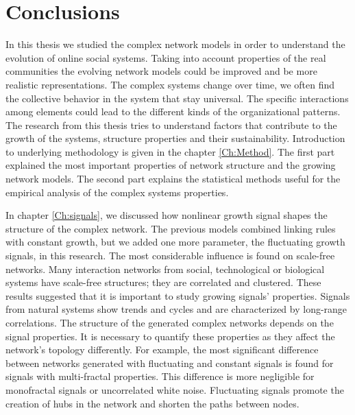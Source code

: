 \chapter{Conclusions} %
\label{Ch:Conclussion}

In this thesis we studied the complex network models in order to understand the evolution of online social systems. Taking into account properties of the real communities the evolving network models could be improved and be more realistic representations. The complex systems change over time, we often find the collective behavior in the system that stay universal. The specific interactions among elements could lead to the different kinds of the organizational patterns. The research from this thesis tries to understand factors that contribute to the growth of the systems, structure properties and their sustainability. Introduction to underlying methodology is given in the chapter \ref{Ch:Method}. The first part explained the most important properties of network structure and the growing network models. The second part explains the statistical methods useful for the empirical analysis of the complex systems properties.  

In chapter \ref{Ch:signals}, we discussed how nonlinear growth signal shapes the structure of the complex network. The previous models combined linking rules with constant growth, but we added one more parameter, the fluctuating growth signals, in this research. The most considerable influence is found on scale-free networks. Many interaction networks from social, technological or biological systems have scale-free structures; they are correlated and clustered. These results suggested that it is important to study growing signals' properties. Signals from natural systems show trends and cycles and are characterized by long-range correlations. The structure of the generated complex networks depends on the signal properties. It is necessary to quantify these properties as they affect the network's topology differently. For example, the most significant difference between networks generated with fluctuating and constant signals is found for signals with multi-fractal properties. This difference is more negligible for monofractal signals or uncorrelated white noise. Fluctuating signals promote the creation of hubs in the network and shorten the paths between nodes.


